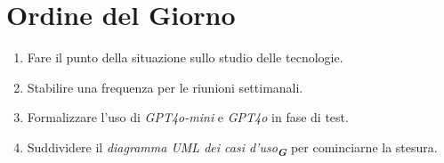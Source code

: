 
\section{Ordine del Giorno}

\begin{enumerate}
    \item Fare il punto della situazione sullo studio delle tecnologie.
    \item Stabilire una frequenza per le riunioni settimanali.
    \item Formalizzare l'uso di \emph{GPT4o-mini} e \emph{GPT4o} in fase di test.
    \item Suddividere il \emph{diagramma UML dei casi d'uso}\textsubscript{\textbf{\textit{G}}} per cominciarne la stesura.
\end{enumerate}

